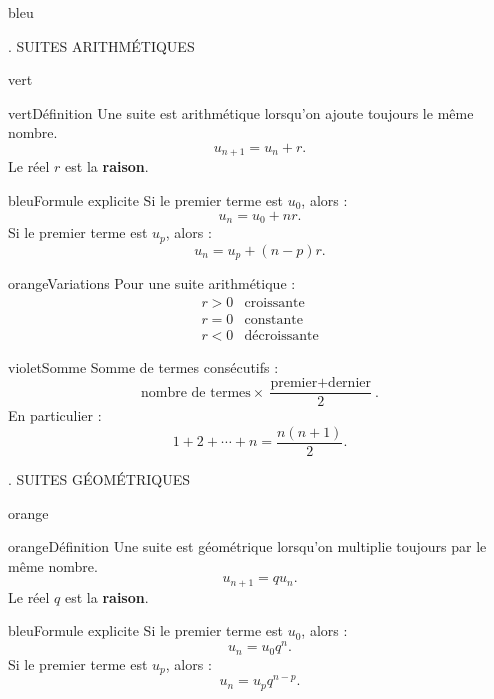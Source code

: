 \documentclass[11pt,a4paper]{article}
\newcommand{\tagcol}[2]{\begin{tcolorbox}[enhanced,colback=#1!11,colframe=#1!45!black,boxrule=0.42pt,arc=2mm,left=1mm,right=1mm,top=0.45mm,bottom=0.45mm,before skip=0mm,after skip=0.85mm,fontupper=\bfseries\scriptsize,colupper=#1!55!black]\centering #2\end{tcolorbox}}
\begin{document}
\begin{landscape}
\begin{minipage}[t]{0.242\linewidth}
\begin{panel}{bleu}
\end{panel}
\end{minipage}\hfill
\begin{minipage}[t]{0.242\linewidth}
\tagcol{vert}{2. SUITES ARITHMÉTIQUES}
\begin{panel}{vert}

\begin{fichebox}{vert}{Définition}
Une suite est arithmétique lorsqu'on ajoute toujours le même nombre.
\[
 u_{n+1}=u_n+r.
\]
Le réel $r$ est la \textbf{raison}.
\end{fichebox}

\begin{fichebox}{bleu}{Formule explicite}
Si le premier terme est $u_0$, alors :
\[
 u_n=u_0+nr.
\]
Si le premier terme est $u_p$, alors :
\[
 u_n=u_p+(n-p)r.
\]
\end{fichebox}

\begin{fichebox}{orange}{Variations}
Pour une suite arithmétique :
\[
\begin{array}{c|c}
r>0 & \text{croissante}\\
r=0 & \text{constante}\\
r<0 & \text{décroissante}
\end{array}
\]
\end{fichebox}

\begin{fichebox}{violet}{Somme}
Somme de termes consécutifs :
\[
\text{nombre de termes}\times\frac{\text{premier}+\text{dernier}}{2}.
\]
En particulier :
\[
1+2+\cdots+n=\frac{n(n+1)}2.
\]
\end{fichebox}

\end{panel}
\end{minipage}\hfill
\begin{minipage}[t]{0.242\linewidth}
\tagcol{orange}{3. SUITES GÉOMÉTRIQUES}
\begin{panel}{orange}

\begin{fichebox}{orange}{Définition}
Une suite est géométrique lorsqu'on multiplie toujours par le même nombre.
\[
 u_{n+1}=q u_n.
\]
Le réel $q$ est la \textbf{raison}.
\end{fichebox}

\begin{fichebox}{bleu}{Formule explicite}
Si le premier terme est $u_0$, alors :
\[
 u_n=u_0q^n.
\]
Si le premier terme est $u_p$, alors :
\[
 u_n=u_pq^{n-p}.
\]
\end{fichebox}


\end{panel}
\end{minipage}
\end{landscape}
\end{document}
